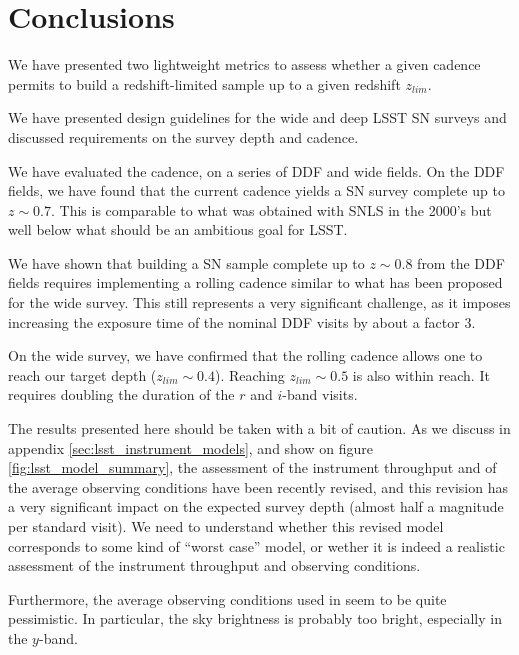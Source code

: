 \documentclass[\docopts]{\docclass}
\begin{document}

\section{Conclusions}
\label{sec:conclusions}

We have presented two lightweight metrics to assess whether a given
cadence permits to build a redshift-limited sample up to a given
redshift $z_{lim}$.

We have presented design guidelines for the wide and deep LSST SN
surveys and discussed requirements on the survey depth and cadence.

We have evaluated the  cadence, on a series of DDF
and wide fields. On the DDF fields, we have found that the current
cadence yields a SN survey complete up to $z \sim 0.7$.  This is
comparable to what was obtained with SNLS in the 2000's but well below
what should be an ambitious goal for LSST.

We have shown that building a SN sample complete up to $z \sim 0.8$
from the DDF fields requires implementing a rolling cadence similar to
what has been proposed for the wide survey. This still represents a
very significant challenge, as it imposes increasing the exposure time
of the nominal DDF visits by about a factor 3.

On the wide survey, we have confirmed that the rolling cadence allows
one to reach our target depth ($z_{lim} \sim 0.4$). Reaching $z_{lim}
\sim 0.5$ is also within reach. It requires doubling the duration of
the $r$ and $i$-band visits.

The results presented here should be taken with a bit of caution.  As
we discuss in appendix \ref{sec:lsst_instrument_models}, and show on
figure \ref{fig:lsst_model_summary}, the assessment of the instrument
throughput and of the average observing conditions have been recently
revised, and this revision has a very significant impact on the
expected survey depth (almost half a magnitude per standard visit). We need to understand 
whether this revised model corresponds to some kind of ``worst case'' model, or wether 
it is indeed a realistic assessment of the instrument throughput and observing conditions.

Furthermore, the average observing conditions used in
 seem to be quite pessimistic.  In particular,
the  sky brightness is probably too bright,
especially in the $y$-band.
\end{document}
